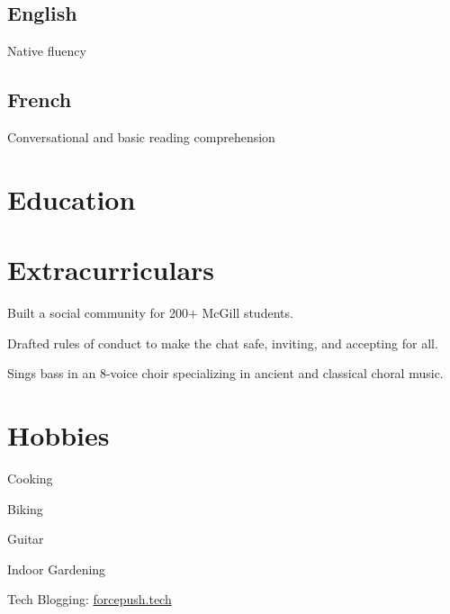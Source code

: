 \documentclass[]{jidicula-resume}
\begin{document}
\subsection{English}
Native fluency
\sectionsep{}
\subsection{French}
Conversational and basic reading comprehension
\sectionsep{}

\section{Education}
\sectionsep{}

\section{Extracurriculars}
 
\vspace{\topsep}
\begin{tightemize}
\item Built a social community for 200+ McGill students.
\item Drafted rules of conduct to make the chat safe, inviting, and accepting for all.
\end{tightemize}
\sectionsep{}
 
\vspace{\topsep}
\begin{tightemize}
\item Sings bass in an 8-voice choir specializing in ancient and classical choral music.
\end{tightemize}
\sectionsep{}

\section{Hobbies}
\sectionsep{}
\begin{tightemize}
\item Cooking
\item Biking
\item Guitar
\item Indoor Gardening
\item Tech Blogging: \href{http://bit.ly/jidicula-site}{forcepush.tech}
\end{tightemize}
\sectionsep{}
\end{document}
